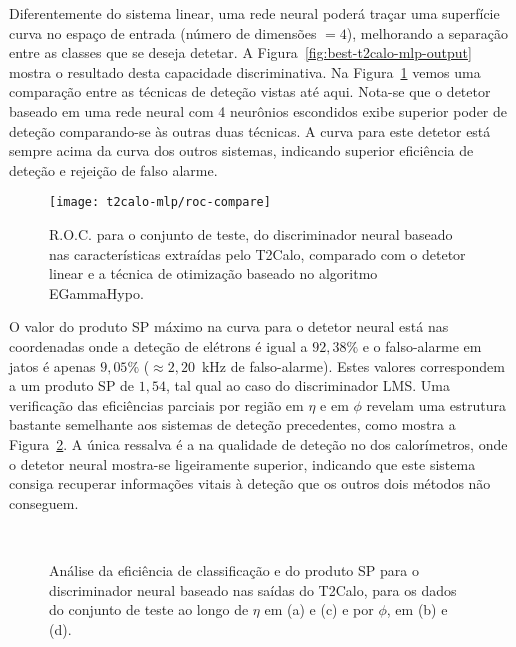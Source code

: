 Diferentemente do sistema linear, uma rede neural poderá traçar uma superfície
curva no espaço de entrada (número de dimensões $=4$), melhorando a separação
entre as classes que se deseja detetar. A
Figura~\ref{fig:best-t2calo-mlp-output} mostra o resultado desta capacidade
discriminativa. Na Figura~\ref{fig:best-t2calo-test-roc} vemos uma comparação
entre as técnicas de deteção vistas até aqui. Nota-se que o detetor baseado em
uma rede neural com 4 neurônios escondidos exibe superior poder de deteção
comparando-se às outras duas técnicas. A curva para este detetor está sempre
acima da curva dos outros sistemas, indicando superior eficiência de deteção e
rejeição de falso alarme.

\begin{figure}
\begin{center}
\texttt{[image: t2calo-mlp/roc-compare]}
\end{center}
\caption{R.O.C. para o conjunto de teste, do discriminador neural baseado nas
características extraídas pelo T2Calo, comparado com o detetor linear e a
técnica de otimização baseado no algoritmo EGammaHypo.}
\label{fig:best-t2calo-test-roc}
\end{figure}

O valor do produto SP máximo na curva para o detetor neural está nas
coordenadas onde a deteção de elétrons é igual a $92,38\%$ e o falso-alarme em
jatos é apenas $9,05\%$ ($\approx 2,20$~kHz de falso-alarme). Estes valores
correspondem a um produto SP de $1,54$, tal qual ao caso do discriminador
LMS. Uma verificação das eficiências parciais por região em $\eta$ e em $\phi$
revelam uma estrutura bastante semelhante aos sistemas de deteção precedentes,
como mostra a Figura~\ref{fig:best-t2calo-eta-phi}. A única ressalva é a na
qualidade de deteção no  dos calorímetros, onde o detetor neural
mostra-se ligeiramente superior, indicando que este sistema consiga recuperar
informações vitais à deteção que os outros dois métodos não conseguem.

\begin{figure}
\begin{center}
\mbox{%
}
\mbox{%
}
\end{center}
\caption{Análise da eficiência de classificação e do produto SP para o
discriminador neural baseado nas saídas do T2Calo, para os dados do conjunto
de teste ao longo de $\eta$ em (a) e (c) e por $\phi$, em (b) e (d).}
\label{fig:best-t2calo-eta-phi}
\end{figure}

